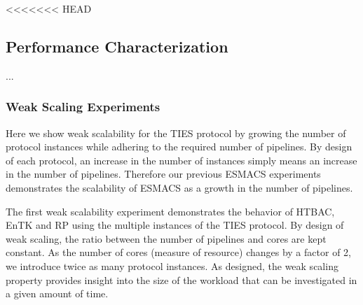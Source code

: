 <<<<<<< HEAD

\subsection{Performance Characterization}

...


\subsubsection{Weak Scaling Experiments}


Here we show weak scalability for the TIES protocol by growing the number of
protocol instances while adhering to the required number of pipelines. By
design of each protocol, an increase in the number of instances simply means
an increase in the number of pipelines. Therefore our previous ESMACS
experiments~\cite{}  demonstrates the scalability of
ESMACS as a growth in the number of pipelines.

The first weak scalability experiment demonstrates the behavior of HTBAC, EnTK
and RP using the multiple instances of the TIES protocol. By design of weak
scaling, the ratio between the number of pipelines and cores are kept
constant. As the number of cores (measure of resource) changes by a factor of
2, we introduce twice as many protocol instances. As designed, the weak
scaling property provides insight into the size of the workload that can be
investigated in a given amount of time.







